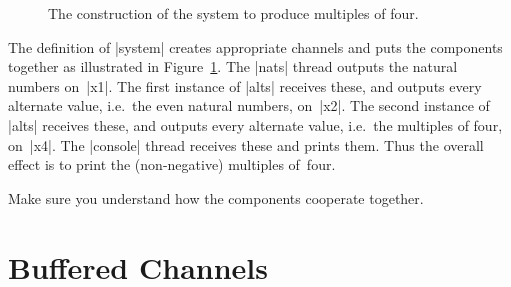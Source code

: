 \begin{figure}
\begin{center}
\end{center}
\caption{The construction of the system to produce multiples of four.}
\label{fig:Mult4-pic}
\end{figure}


The definition of |system| creates appropriate channels and puts the
components together as illustrated in Figure~\ref{fig:Mult4-pic}.
The |nats| thread outputs the natural numbers on~|x1|.  The first instance of
|alts| receives these, and outputs every alternate value, i.e.~the even
natural numbers, on~|x2|.  The second instance of |alts| receives these, and
outputs every alternate value, i.e.~the multiples of four, on~|x4|.  The
|console| thread receives these and prints them.  Thus the overall effect is
to print the (non-negative) multiples of~four.

\begin{instruction}
Make sure you understand how the components cooperate together.
\end{instruction}


\section{Buffered Channels}

